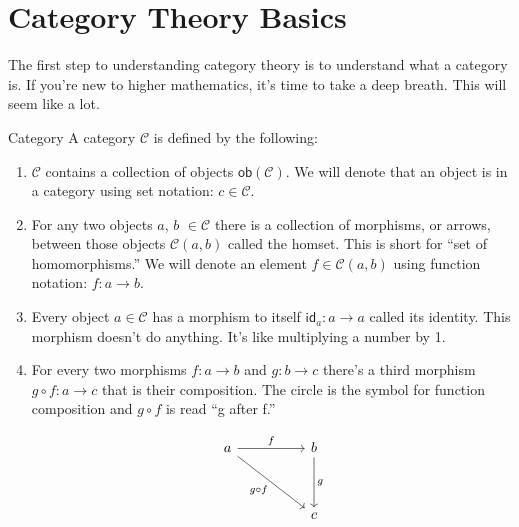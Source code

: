 \documentclass[12pt]{article}
\begin{document}
\section*{Category Theory Basics}
The first step to understanding category theory is to understand what a category is.
If you're new to higher mathematics, it's time to take a deep breath.
This will seem like a lot.

\begin{definition}{Category}{}
    A category $\mathcal{C}$ is defined by the following:
    \begin{enumerate}
        \item $\mathcal{C}$ contains a collection of objects $\mathsf{ob}(\mathcal{C})$. We will denote that an object is in a category using set notation: $c\in\mathcal{C}$.
        \item For any two objects $a$, $b$ $\in \mathcal{C}$ there is a collection of morphisms, or arrows, between those objects $\mathcal{C}(a,b)$ called the homset. This is short for ``set of homomorphisms.'' We will denote an element $f\in\mathcal{C}(a,b)$ using function notation: $f:a\rightarrow b$.
        \item Every object $a\in \mathcal{C}$ has a morphism to itself $\mathsf{id}_a:a\rightarrow a$ called its identity. This morphism doesn't do anything. It's like multiplying a number by 1.
        \item For every two morphisms $f:a\rightarrow b$ and $g: b\rightarrow c$ there's a third morphism $g\circ f:a\rightarrow c$ that is their composition. The circle is the symbol for function composition and $g \circ f$ is read ``g after f.''

              \[\begin{tikzcd}
                      a && b \\
                      \\
                      && c
                      \arrow["f", from=1-1, to=1-3]
                      \arrow["g", from=1-3, to=3-3]
                      \arrow["{g\circ f}"', from=1-1, to=3-3]
                  \end{tikzcd}\]

    \end{enumerate}
\end{definition}
\end{document}
